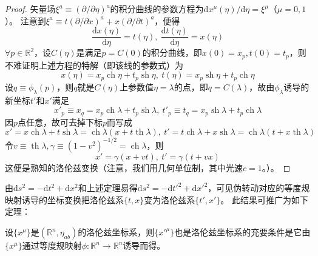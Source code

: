 \begin{proof}
矢量场$\xi^a \equiv (\partial / \partial\eta)^a$的积分曲线的参数方程为$\mathrm{d}x^\mu(\eta) / \mathrm{d}\eta = \xi^\mu$（$\mu = 0, 1$）。
注意到$\xi^a \equiv t(\partial / \partial x)^a + x(\partial / \partial t)^a$，便得
$$\frac{\mathrm{d}x(\eta)}{\mathrm{d}\eta} = t(\eta), ~ \frac{\mathrm{d}t(\eta)}{\mathrm{d}\eta} = x(\eta)$$
$\forall p \in \mathbb{R}^2$，设$C(\eta)$是满足$p = C(0)$的积分曲线，即$x(0) = x_p, t(0) = t_p$，则不难证明上述方程的特解（即该线的参数式）为
$$x(\eta) = x_p\operatorname{ch}\eta + t_p\operatorname{sh}\eta, ~ t(\eta) = x_p\operatorname{sh}\eta + t_p\operatorname{ch}\eta$$
设$q \equiv \phi_\lambda(p)$，则$q$就是$C(\eta)$上参数值$\eta = \lambda$的点，即$q = C(\lambda)$，故由$\phi_\lambda$诱导的新坐标$t'$和$x'$满足
$$x'_p \equiv x_q = x_p\operatorname{ch}\lambda + t_p\operatorname{sh}\lambda, ~ t'_p \equiv t_q = x_p\operatorname{sh}\lambda + t_p\operatorname{ch}\lambda$$
因$p$点任意，故可去掉下标$p$而写成
$$x' = x\operatorname{ch}\lambda + t\operatorname{sh}\lambda = \operatorname{ch}\lambda(x + t\operatorname{th}\lambda), ~ t' = t\operatorname{ch}\lambda + x\operatorname{sh}\lambda = \operatorname{ch}\lambda(t + x\operatorname{th}\lambda)$$
令$v \equiv \operatorname{th}\lambda, \gamma \equiv (1 - v^2)^{-1/2} = \operatorname{ch}\lambda$，则
$$x' = \gamma(x + vt), ~ t'= \gamma(t + vx)$$
这便是熟知的洛伦兹变换（注意，我们用几何单位制，其中光速$c = 1$。）。
\end{proof}

由$\mathrm{d}s^2 = -\mathrm{d}t^2 + \mathrm{d}x^2$和上述定理易得$\mathrm{d}s^2 = -\mathrm{d}t'^2 + \mathrm{d}x'^2$，可见伪转动对应的等度规映射诱导的坐标变换把洛伦兹系$\{t, x\}$变为洛伦兹系$\{t', x'\}$。
此结果可推广为如下定理：

\begin{theorem}
设$\{x^\mu\}$是$(\mathbb{R}^n, \eta_{ab})$的洛伦兹坐标系，则$\{x'^\mu\}$也是洛伦兹坐标系的充要条件是它由$\{x^\mu\}$通过等度规映射$\phi \colon \mathbb{R}^n \to \mathbb{R}^n$诱导而得。
\end{theorem}

